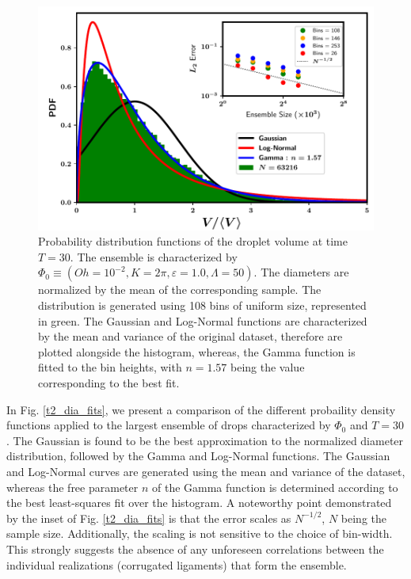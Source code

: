 \begin{figure}
\centering
\includegraphics{plots/drop_stats/long_time_volume_fits.pdf}
\caption{Probability distribution functions of the droplet volume at time $T = 30$. 
The ensemble is characterized by $\Phi_0 \equiv \left( Oh = 10^{-2}, K = 2\pi , \varepsilon = 1.0 , \Lambda = 50 \right)$. 
The diameters are normalized by the mean of the corresponding sample.  
The distribution is generated using 108 bins of uniform size, represented in green.  
The Gaussian and Log-Normal functions are characterized by the mean and variance of the original dataset, 
therefore are plotted alongside the histogram, whereas, the Gamma function is fitted to the bin heights,
with $n= 1.57$ being the value corresponding to the best fit.
	}
\label{t2_vol_fits}
\end{figure}


In Fig. \ref{t2_dia_fits}, we present a comparison of the different probaility 
density functions applied to the largest ensemble of drops characterized by $\Phi_0$ and $T=30$. 
The Gaussian is found to be the best approximation to the normalized 
diameter distribution, followed by the Gamma and Log-Normal functions.
The Gaussian and Log-Normal curves are generated using the mean and variance 
of the dataset, whereas the free parameter $n$ of the Gamma function is determined
according to the best least-squares fit over the histogram. 
A noteworthy point demonstrated by the inset of Fig. \ref{t2_dia_fits} is that
the error  scales as $N^{-1/2}$, $N$ being the sample size.
Additionally, the scaling is not sensitive to the choice of bin-width. 
This strongly suggests the absence of any unforeseen correlations between the 
individual realizations (corrugated ligaments) that form the ensemble.


